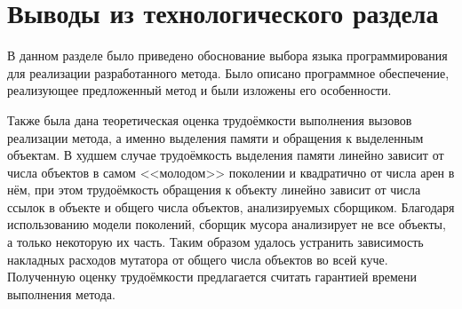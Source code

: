 \section*{Выводы из технологического раздела}

В данном разделе было приведено обоснование выбора языка программирования для реализации разработанного метода. Было описано программное обеспечение, реализующее предложенный метод и были изложены его особенности.

Также была дана теоретическая оценка трудоёмкости выполнения вызовов реализации метода, а именно выделения памяти и обращения к выделенным объектам. В худшем случае трудоёмкость выделения памяти линейно зависит от числа объектов в самом <<молодом>> поколении и квадратично от числа арен в нём, при этом трудоёмкость обращения к объекту линейно зависит от числа ссылок в объекте и общего числа объектов, анализируемых сборщиком. Благодаря использованию модели поколений, сборщик мусора анализирует не все объекты, а только некоторую их часть. Таким образом удалось устранить зависимость накладных расходов мутатора от общего числа объектов во всей куче. Полученную оценку трудоёмкости предлагается считать гарантией времени выполнения метода.
